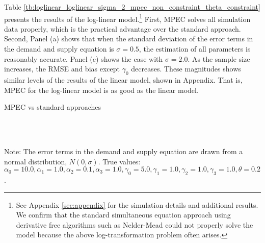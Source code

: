 \documentclass[11pt, a4paper]{article}
\begin{document}
Table \ref{tb:loglinear_loglinear_sigma_2_mpec_non_constraint_theta_constraint} presents the results of the log-linear model.\footnote{See Appendix \ref{sec:appendix} for the simulation details and additional results. We confirm that the standard simultaneous equation approach using derivative free algorithms such as Nelder-Mead could not properly solve the model because the above log-transformation problem often arises.} 
First, MPEC solves all simulation data properly, which is the practical advantage over the standard approach.
Second, Panel (a) shows that when the standard deviation of the error terms in the demand and supply equation is $\sigma = 0.5$, the estimation of all parameters is reasonably accurate.
Panel (c) shows the case with $\sigma = 2.0$. 
As the sample size increases, the RMSE and bias except $\gamma_0$ decreases. These magnitudes shows similar levels of the results of the linear model, shown in Appendix. 
That is, MPEC for the log-linear model is as good as the linear model.



\begin{table}[!htbp]
  \begin{center}
      \caption{MPEC vs standard approaches}
      \label{tb:loglinear_loglinear_sigma_2_mpec_non_constraint_theta_constraint} 
      \subfloat[$\sigma=1.0$ (MPEC)]{}\\
      \subfloat[$\sigma=1.0$ (Separate)]{}\\
      \subfloat[$\sigma=1.0$ (Simultaneous)]{}
  \end{center}
  \footnotesize
  Note: The error terms in the demand and supply equation are drawn from a normal distribution, $N(0, \sigma)$. True values: $\alpha_0=10.0,\alpha_1=1.0,\alpha_2=0.1,\alpha_3=1.0,\gamma_0=5.0,\gamma_1=1.0,\gamma_2=1.0,\gamma_3=1.0,\theta=0.2$.
\end{table} 
\end{document}

